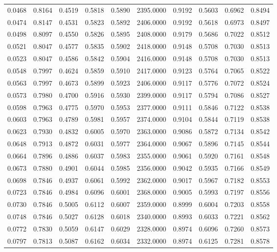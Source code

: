 \begin{tabular}{rrrrrrrrrr}
0.0468 & 0.8164 & 0.4519 & 0.5818 & 0.5890 & 2395.0000 & 0.9192 & 0.5603 & 0.6962 & 0.8494 \\
0.0474 & 0.8147 & 0.4531 & 0.5823 & 0.5892 & 2406.0000 & 0.9192 & 0.5618 & 0.6973 & 0.8497 \\
0.0498 & 0.8097 & 0.4550 & 0.5826 & 0.5895 & 2408.0000 & 0.9179 & 0.5686 & 0.7022 & 0.8512 \\
0.0521 & 0.8047 & 0.4577 & 0.5835 & 0.5902 & 2418.0000 & 0.9148 & 0.5708 & 0.7030 & 0.8513 \\
0.0523 & 0.8047 & 0.4586 & 0.5842 & 0.5904 & 2416.0000 & 0.9148 & 0.5708 & 0.7030 & 0.8513 \\
0.0548 & 0.7997 & 0.4624 & 0.5859 & 0.5910 & 2417.0000 & 0.9123 & 0.5764 & 0.7065 & 0.8522 \\
0.0563 & 0.7997 & 0.4673 & 0.5899 & 0.5923 & 2406.0000 & 0.9117 & 0.5776 & 0.7072 & 0.8524 \\
0.0573 & 0.7980 & 0.4700 & 0.5916 & 0.5930 & 2399.0000 & 0.9117 & 0.5794 & 0.7086 & 0.8527 \\
0.0598 & 0.7963 & 0.4775 & 0.5970 & 0.5953 & 2377.0000 & 0.9111 & 0.5846 & 0.7122 & 0.8538 \\
0.0603 & 0.7963 & 0.4789 & 0.5981 & 0.5957 & 2374.0000 & 0.9104 & 0.5844 & 0.7119 & 0.8538 \\
0.0623 & 0.7930 & 0.4832 & 0.6005 & 0.5970 & 2363.0000 & 0.9086 & 0.5872 & 0.7134 & 0.8542 \\
0.0648 & 0.7913 & 0.4872 & 0.6031 & 0.5977 & 2364.0000 & 0.9067 & 0.5896 & 0.7145 & 0.8544 \\
0.0664 & 0.7896 & 0.4886 & 0.6037 & 0.5983 & 2355.0000 & 0.9061 & 0.5920 & 0.7161 & 0.8548 \\
0.0673 & 0.7880 & 0.4901 & 0.6044 & 0.5985 & 2356.0000 & 0.9042 & 0.5935 & 0.7166 & 0.8549 \\
0.0698 & 0.7846 & 0.4937 & 0.6061 & 0.5992 & 2362.0000 & 0.9017 & 0.5967 & 0.7182 & 0.8553 \\
0.0723 & 0.7846 & 0.4984 & 0.6096 & 0.6001 & 2368.0000 & 0.9005 & 0.5993 & 0.7197 & 0.8556 \\
0.0730 & 0.7846 & 0.5005 & 0.6112 & 0.6007 & 2359.0000 & 0.8999 & 0.6004 & 0.7203 & 0.8558 \\
0.0748 & 0.7846 & 0.5027 & 0.6128 & 0.6018 & 2340.0000 & 0.8993 & 0.6033 & 0.7221 & 0.8562 \\
0.0772 & 0.7830 & 0.5059 & 0.6147 & 0.6029 & 2328.0000 & 0.8974 & 0.6096 & 0.7260 & 0.8573 \\
0.0797 & 0.7813 & 0.5087 & 0.6162 & 0.6034 & 2332.0000 & 0.8974 & 0.6125 & 0.7281 & 0.8578 \\

\end{tabular}
